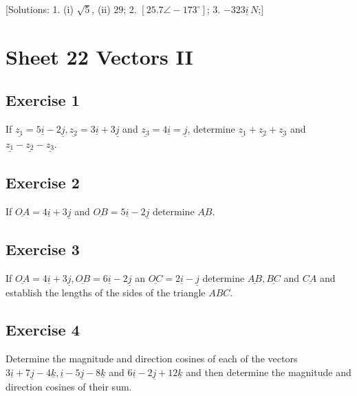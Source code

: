 \documentclass[
  11pt,
  oneside]{book}
\newcommand{\slide}{}
\theoremstyle{definition}
\theoremstyle{definition}
\theoremstyle{definition}
\theoremstyle{definition}
\theoremstyle{remark}
\begin{document}
{[}Solutions:
1. (i) \(\sqrt{5}\), (ii) \(29\);
2. \([25.7 \angle -173^{\circ}]\);
3. \(-323\underline{i}\,N\);{]}

\slide

\section{Sheet 22 Vectors II}\label{sheet-22-vectors-ii}

\subsection*{Exercise 1}\label{exercise-1-13}

If \(\underline{z_1} = 5\underline{i}-2\underline{j}, \underline{z_2} = 3\underline{i}+3\underline{j}\) and \(\underline{z_3}=4\underline{i}=\underline{j}\), determine \(\underline{z_1}+\underline{z_2}+\underline{z_3}\) and \(\underline{z_1}-\underline{z_2}-\underline{z_3}\).

\slide

\subsection*{Exercise 2}\label{exercise-2-13}

If \(\underline{OA}=4\underline{i}+3\underline{j}\) and \(\underline{OB}=5\underline{i}-2\underline{j}\) determine \(\underline{AB}\).

\slide

\subsection*{Exercise 3}\label{exercise-3-11}

If \(\underline{OA} = 4\underline{i}+3\underline{j}, \underline{OB}=6\underline{i}-2\underline{j}\) an \(\underline{OC}=2\underline{i}-\underline{j}\) determine \(\underline{AB}, \underline{BC}\) and \(\underline{CA}\) and establish the lengths of the sides of the triangle \(ABC\).

\slide

\subsection*{Exercise 4}\label{exercise-4-9}

Determine the magnitude and direction cosines of each of the vectors \(3\underline{i}+7\underline{j}-4\underline{k}, \underline{i}-5\underline{j}-8\underline{k}\) and \(6\underline{i}-2\underline{j}+12\underline{k}\) and then determine the magnitude and direction cosines of their sum.
\end{document}
